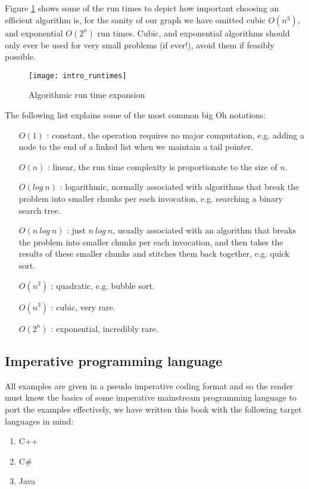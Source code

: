 Figure \ref{algorithmic_runtime_expansion} shows some of the run times to depict how important choosing an efficient algorithm is, for the sanity of our graph we have omitted cubic $O(n^{3})$, and exponential $O(2^{n})$ run times. Cubic, and exponential algorithms should only ever be used for very small problems (if ever!), avoid them if feasibly possible. 

\begin{figure}
\texttt{[image: intro\_runtimes]}
\caption{Algorithmic run time expansion} \label{algorithmic_runtime_expansion}
\end{figure}

The following list explains some of the most common big Oh notations:

\begin{enumerate}
\item[$O(1)$]: constant, the operation requires no major computation, e.g. adding a node to the end of a linked list when we maintain a tail pointer.
\item[$O(n)$]: linear, the run time complexity is proportionate to the size of $n$.
\item[$O(log~n)$]: logarithmic, normally associated with algorithms that break the problem into smaller chunks per each invocation, e.g. searching a binary search tree.
\item[$O(n~log~n)$]: just $n~log~n$, usually associated with an algorithm that breaks the problem into smaller chunks per each invocation, and then takes the results of these smaller chunks and stitches them back together, e.g. quick sort.
\item[$O(n^{2})$]: quadratic, e.g. bubble sort.
\item[$O(n^{3})$]: cubic, very rare.
\item[$O(2^{n})$]: exponential, incredibly rare.
\end{enumerate}

\subsection{Imperative programming language}
All examples are given in a pseudo imperative coding format and so the reader must know the basics of some imperative mainstream programming language to port the examples effectively, we have written this book with the following target languages in mind:

\begin{enumerate}
\item C++
\item C\#
\item Java
\end{enumerate}

